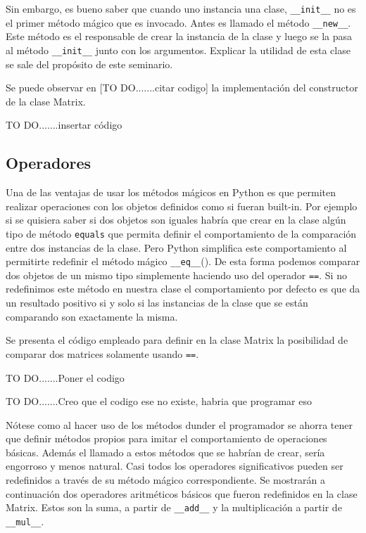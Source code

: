 \documentclass[10pt]{article}
\newcommand{\mgc}[1]{\texttt{\_\_#1\_\_}}
\newcommand{\csl}[1]{\texttt{#1}}
\newcommand{\todo}[1]{\color{red}TO DO.......#1\color{black}}
\begin{document}
Sin embargo, es bueno saber que cuando uno instancia una clase, \mgc{init} no es el primer m\'etodo m\'agico que es invocado. Antes es llamado el m\'etodo  \mgc{new}. Este m\'etodo es el responsable de crear la instancia de la clase y luego se la pasa al m\'etodo \mgc{init} junto con los argumentos. Explicar la utilidad de esta clase se sale del prop\'osito de este seminario.

Se puede observar en [\todo{citar codigo}] la implementaci\'on del constructor de la clase Matrix.

\todo{insertar c\'odigo}

\subsection{Operadores}

Una de las ventajas de usar los m\'etodos  m\'agicos en Python es que permiten realizar operaciones con los objetos definidos como si fueran built-in. Por ejemplo si se quisiera saber si dos objetos son iguales habr\'ia que crear en la clase alg\'un tipo de m\'etodo \csl{equals} que permita definir el comportamiento de la comparaci\'on entre dos instancias de la clase. Pero Python simplifica este comportamiento al permitirte redefinir el m\'etodo m\'agico \mgc{eq}(). De esta forma podemos comparar dos objetos de un mismo tipo simplemente haciendo uso del operador \csl{==}. Si no redefinimos este m\'etodo en nuestra clase el comportamiento por defecto es que da un resultado positivo si y solo si las instancias de la clase que se est\'an comparando son exactamente la misma.

Se presenta el c\'odigo empleado para definir en la clase Matrix la posibilidad de comparar dos matrices solamente usando \csl{==}.

\todo{Poner el codigo}

\todo{Creo que el codigo ese no existe, habria que programar eso}


N\'otese como al hacer uso de los m\'etodos dunder el programador se ahorra tener que definir m\'etodos propios para imitar el comportamiento de operaciones b\'asicas. Adem\'as el llamado a estos m\'etodos que se habr\'ian de crear, ser\'ia engorroso y menos natural. Casi todos los operadores significativos pueden ser redefinidos a trav\'es de su m\'etodo m\'agico correspondiente. Se mostrar\'an a continuaci\'on dos operadores aritm\'eticos b\'asicos que fueron redefinidos en la clase Matrix. Estos son la suma, a partir de \mgc{add} y la multiplicaci\'on a partir de \mgc{mul}.
\end{document}
